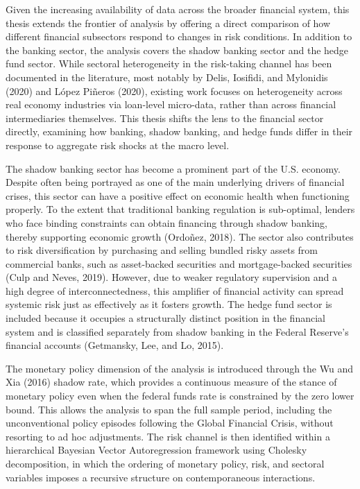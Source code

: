 \documentclass[12pt,a4paper]{report}
\begin{document}
Given the increasing availability of data across the broader financial system, this thesis extends the frontier of analysis by offering a direct comparison of how different financial subsectors respond to changes in risk conditions. In addition to the banking sector, the analysis covers the shadow banking sector and the hedge fund sector. While sectoral heterogeneity in the risk-taking channel has been documented in the literature, most notably by Delis, Iosifidi, and Mylonidis (2020) and López Piñeros (2020), existing work focuses on heterogeneity across real economy industries via loan-level micro-data, rather than across financial intermediaries themselves. This thesis shifts the lens to the financial sector directly, examining how banking, shadow banking, and hedge funds differ in their response to aggregate risk shocks at the macro level.

The shadow banking sector has become a prominent part of the U.S. economy. Despite often being portrayed as one of the main underlying drivers of financial crises, this sector can have a positive effect on economic health when functioning properly. To the extent that traditional banking regulation is sub-optimal, lenders who face binding constraints can obtain financing through shadow banking, thereby supporting economic growth (Ordoñez, 2018). The sector also contributes to risk diversification by purchasing and selling bundled risky assets from commercial banks, such as asset-backed securities and mortgage-backed securities (Culp and Neves, 2019). However, due to weaker regulatory supervision and a high degree of interconnectedness, this amplifier of financial activity can spread systemic risk just as effectively as it fosters growth. The hedge fund sector is included because it occupies a structurally distinct position in the financial system and is classified separately from shadow banking in the Federal Reserve's financial accounts (Getmansky, Lee, and Lo, 2015).


The monetary policy dimension of the analysis is introduced through the Wu and Xia 
(2016) shadow rate, which provides a continuous measure of the stance of monetary 
policy even when the federal funds rate is constrained by the zero lower bound. This 
allows the analysis to span the full sample period, including the unconventional policy 
episodes following the Global Financial Crisis, without resorting to ad hoc adjustments. 
The risk channel is then identified within a hierarchical Bayesian Vector Autoregression 
framework using Cholesky decomposition, in which the ordering of monetary policy, risk, 
and sectoral variables imposes a recursive structure on contemporaneous interactions.
\end{document}
